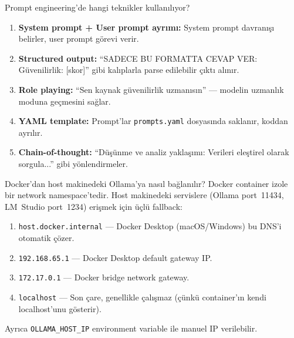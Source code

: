 \begin{mulakat}{Prompt engineering'de hangi teknikler kullan{\i}l{\i}yor?}
\begin{enumerate}
  \item \textbf{System prompt + User prompt ayr{\i}m{\i}:} System prompt davran{\i}\c{s}{\i} belirler, user prompt g\"{o}revi verir.
  \item \textbf{Structured output:} ``SADECE BU FORMATTA CEVAP VER: G\"{u}venilirlik: [skor]'' gibi kal{\i}plarla parse edilebilir \c{c}{\i}kt{\i} al{\i}n{\i}r.
  \item \textbf{Role playing:} ``Sen kaynak g\"{u}venilirlik uzman{\i}s{\i}n'' --- modelin uzmanl{\i}k moduna ge\c{c}mesini sa\u{g}lar.
  \item \textbf{YAML template:} Prompt'lar \texttt{prompts.yaml} dosyas{\i}nda saklan{\i}r, koddan ayr{\i}l{\i}r.
  \item \textbf{Chain-of-thought:} ``D\"{u}\c{s}\"{u}nme ve analiz yakla\c{s}{\i}m{\i}: Verileri ele\c{s}tirel olarak sorgula...'' gibi y\"{o}nlendirmeler.
\end{enumerate}
\end{mulakat}

\begin{mulakat}{Docker'dan host makinedeki Ollama'ya nas{\i}l ba\u{g}lan{\i}l{\i}r?}
Docker container izole bir network namespace'tedir. Host makinedeki servislere (Ollama port~11434, LM~Studio port~1234) eri\c{s}mek i\c{c}in \"{u}\c{c}l\"{u} fallback:

\begin{enumerate}
  \item \texttt{host.docker.internal} --- Docker Desktop (macOS/Windows) bu DNS'i otomatik \c{c}\"{o}zer.
  \item \texttt{192.168.65.1} --- Docker Desktop default gateway IP.
  \item \texttt{172.17.0.1} --- Docker bridge network gateway.
  \item \texttt{localhost} --- Son \c{c}are, genellikle \c{c}al{\i}\c{s}maz (\c{c}\"{u}nk\"{u} container'{\i}n kendi localhost'unu g\"{o}sterir).
\end{enumerate}

Ayr{\i}ca \texttt{OLLAMA\_HOST\_IP} environment variable ile manuel IP verilebilir.
\end{mulakat}

